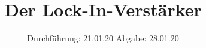 

\subject{V303}
\title{Der Lock-In-Verstärker}
\date{%
  Durchführung: 21.01.20
  \hspace{3em}
  Abgabe: 28.01.20
}



\maketitle
\thispagestyle{empty}
\tableofcontents
\newpage







\printbibliography{}


